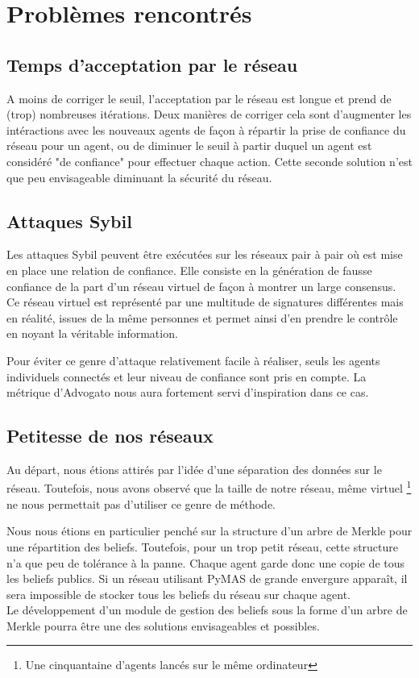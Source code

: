 \documentclass[11pt]{book}
\begin{document}
\chapter{Problèmes rencontrés}
\section{Temps d'acceptation par le réseau}
A moins de corriger le seuil, l'acceptation par le réseau est longue et prend 
de (trop) nombreuses itérations. Deux manières de corriger cela sont 
d'augmenter les intéractions avec les nouveaux agents de façon à répartir la
prise de confiance du réseau pour un agent, ou de diminuer le seuil à 
partir duquel un agent est considéré "de confiance" pour effectuer chaque 
action. Cette seconde solution n'est que peu envisageable diminuant la 
sécurité du réseau.

\section{Attaques Sybil}
Les attaques Sybil peuvent être exécutées sur les réseaux pair à pair où est 
mise en place une relation de confiance. \cite{danezis2005sybil} 
Elle consiste en la génération de fausse confiance de la part d'un réseau 
virtuel de façon à montrer un large consensus. Ce réseau virtuel est 
représenté par une multitude de signatures différentes mais en réalité, 
issues de la même personnes \cite{shi2008smushing} et permet ainsi 
d'en prendre le contrôle en noyant la véritable information.

Pour éviter ce genre d'attaque relativement facile à réaliser, seuls 
les agents individuels connectés et leur niveau de confiance sont pris 
en compte. La métrique d'Advogato nous aura fortement servi d'inspiration 
dans ce cas.

\section{Petitesse de nos réseaux}
Au départ, nous étions attirés par l'idée d'une séparation des données sur 
le réseau. Toutefois, nous avons observé que la taille de notre réseau, même 
virtuel \footnote{Une cinquantaine d'agents lancés sur le même ordinateur} ne 
nous permettait pas d'utiliser ce genre de méthode. 

Nous nous étions en particulier penché sur la structure d'un arbre de Merkle 
pour une répartition des beliefs. Toutefois, pour un trop petit réseau, cette
structure n'a que peu de tolérance à la panne. Chaque agent garde donc une 
copie de tous les beliefs publics. Si un réseau utilisant PyMAS de grande 
envergure apparaît, il sera impossible de stocker tous les beliefs du réseau 
sur chaque agent. \\
Le développement d'un module de gestion des beliefs sous la forme d'un 
arbre de Merkle pourra être une des solutions envisageables et possibles.
\end{document}
